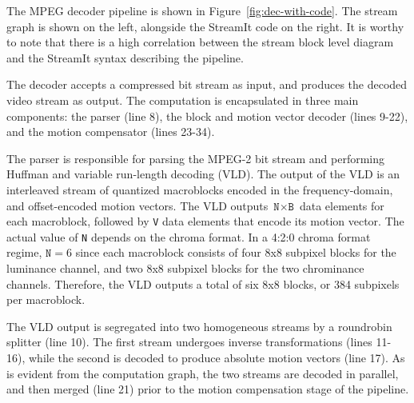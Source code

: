 \begin{figure*}[t]
  \centerline{}
  \caption{MPEG-2 decoder block diagram and corresponding StreamIt code.}
  \label{fig:dec-with-code}
\end{figure*}


The MPEG decoder pipeline is shown in
Figure~\ref{fig:dec-with-code}. The stream graph is shown on the left,
alongside the StreamIt code on the right. It is worthy to note that
there is a high correlation between the stream block level diagram and
the StreamIt syntax describing the pipeline.

The decoder accepts a compressed bit stream as input, and produces the
decoded video stream as output. The computation is encapsulated in
three main components: the parser (line 8), the block and motion vector
decoder (lines 9-22), and the motion compensator (lines 23-34).

The parser is responsible for parsing the MPEG-2 bit stream and
performing Huffman and variable run-length decoding (VLD). The output
of the VLD is an interleaved stream of quantized macroblocks encoded
in the frequency-domain, and offset-encoded motion vectors. The VLD
outputs $\texttt{N}\times\texttt{B}$ data elements for each
macroblock, followed by \texttt{V} data elements that encode its
motion vector. The actual value of \texttt{N} depends on the chroma
format. In a 4:2:0 chroma format regime, $\texttt{N}=6$ since each
macroblock consists of four 8x8 subpixel blocks for the luminance channel,
and two 8x8 subpixel blocks for the two chrominance
channels. Therefore, the VLD outputs a total of six 8x8 blocks,
or 384 subpixels per macroblock.

The VLD output is segregated into two homogeneous streams by a
roundrobin splitter (line 10). The first stream undergoes inverse
transformations (lines 11-16), while the second is decoded to produce
absolute motion vectors (line 17). As is evident from the computation
graph, the two streams are decoded in parallel, and then merged (line
21) prior to the motion compensation stage of the pipeline.

